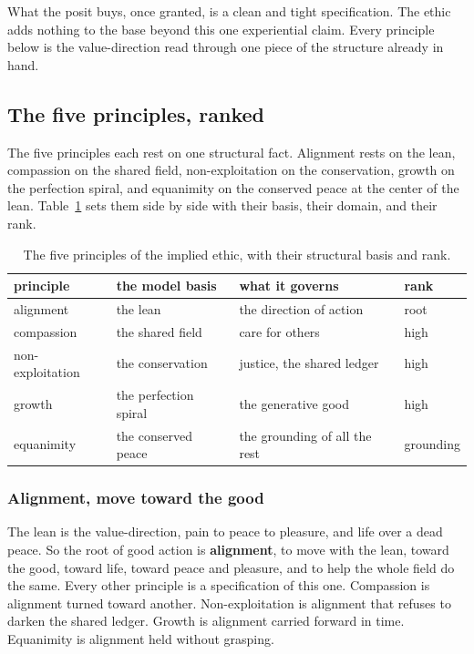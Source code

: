 What the posit buys, once granted, is a clean and tight specification. The ethic adds nothing to the base beyond this one experiential claim. Every principle below is the value-direction read through one piece of the structure already in hand.

\subsection{The five principles, ranked}

The five principles each rest on one structural fact. Alignment rests on the lean, compassion on the shared field, non-exploitation on the conservation, growth on the perfection spiral, and equanimity on the conserved peace at the center of the lean. Table~\ref{tab:five-principles} sets them side by side with their basis, their domain, and their rank.

\begin{table}[ht]
\centering
\begin{tabular}{@{}llll@{}}
\toprule
principle & the model basis & what it governs & rank \\
\midrule
alignment & the lean & the direction of action & root \\
compassion & the shared field & care for others & high \\
non-exploitation & the conservation & justice, the shared ledger & high \\
growth & the perfection spiral & the generative good & high \\
equanimity & the conserved peace & the grounding of all the rest & grounding \\
\bottomrule
\end{tabular}
\caption{The five principles of the implied ethic, with their structural basis and rank.}
\label{tab:five-principles}
\end{table}

\subsubsection{Alignment, move toward the good}

The lean is the value-direction, pain to peace to pleasure, and life over a dead peace. So the root of good action is \textbf{alignment}, to move with the lean, toward the good, toward life, toward peace and pleasure, and to help the whole field do the same. Every other principle is a specification of this one. Compassion is alignment turned toward another. Non-exploitation is alignment that refuses to darken the shared ledger. Growth is alignment carried forward in time. Equanimity is alignment held without grasping.

